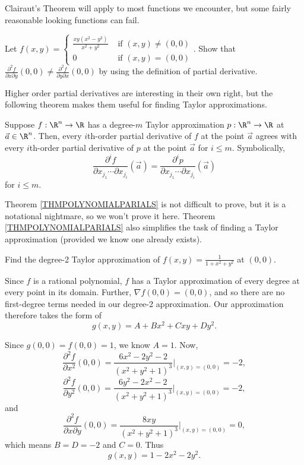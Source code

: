 Clairaut's Theorem will apply to most functions we encounter, but
some fairly reasonable looking functions can fail.

\begin{exercise}
	Let $f(x,y)=\begin{cases} \frac{xy(x^2-y^2)}{x^2+y^2} &\text{ if } (x,y)\neq (0,0)\\
	0 &\text{ if }(x,y)=(0,0)\end{cases}$.  Show that $\frac{\partial^2 f}{\partial x\partial y}(0,0)\neq 
	\frac{\partial^2 f}{\partial y\partial x}(0,0)$ by using the definition of partial derivative.
\end{exercise}

Higher order partial derivatives are interesting in their own right,
but the following theorem makes them useful for finding Taylor approximations.

\begin{theorem}
	\label{THMPOLYNOMIALPARIALS}
	Suppose $f:\R^n\to\R$ has a degree-$m$ Taylor approximation $p:\R^n\to\R$
	at $\vec a\in\R^n$.
	Then, every $i$th-order partial derivative of $f$ at the point $\vec a$
	agrees with every $i$th-order
	partial derivative of $p$ at the point $\vec a$ for $i\leq m$.
	Symbolically,
	\[
		\frac{\partial^i f}{\partial x_{j_1}\cdots \partial x_{j_i}}(\vec a)
		=
		\frac{\partial^i p}{\partial x_{j_1}\cdots \partial x_{j_i}}(\vec a)
	\]
	for $i\leq m$.
\end{theorem}

Theorem \ref{THMPOLYNOMIALPARIALS} is not difficult to prove, but it is a notational
nightmare, so we won't prove it here.  Theorem \ref{THMPOLYNOMIALPARIALS} also
simplifies the task of finding a Taylor approximation (provided we know one already exists).

\begin{example}
	\label{EXTDEGREE2}
	Find the degree-2 Taylor approximation of $f(x,y)=\frac{1}{1+x^2+y^2}$ at
	$(0,0)$.

	Since $f$ is a rational polynomial, $f$ has a Taylor approximation
	of every degree at every point in its domain.  Further, $\nabla f(0,0)=(0,0)$,
	and so there are no first-degree terms needed in our degree-2 approximation.
	Our approximation therefore takes the form of
	\[
		g(x,y) = A+Bx^2+Cxy+Dy^2.
	\]

	Since $g(0,0)=f(0,0)=1$, we know $A=1$.  Now, 
	\[
		\frac{\partial^2 f}{\partial x^2}(0,0) = \frac{6x^2-2y^2-2}{(x^2+y^2+1)^3}\Bigg|_{(x,y)=(0,0)} = -2,
	\]
	\[
		\frac{\partial^2 f}{\partial y^2}(0,0) = \frac{6y^2-2x^2-2}{(x^2+y^2+1)^3}\Bigg|_{(x,y)=(0,0)} = -2,
	\]
	and
	\[
		\frac{\partial^2 f}{\partial x\partial y}(0,0) = \frac{8xy}{(x^2+y^2+1)^3}\Bigg|_{(x,y)=(0,0)} = 0,
	\]
	which means $B=D=-2$ and $C=0$.  Thus
	\[
		g(x,y) = 1 - 2x^2-2y^2.
	\]
\end{example}

